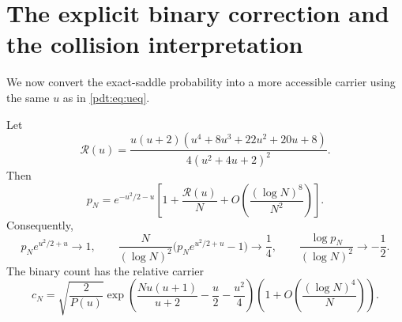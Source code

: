 \section{The explicit binary correction and the collision interpretation}
\label{pdt:sec:rational}
We now convert the exact-saddle probability into a more accessible carrier using the same $u$ as in \eqref{pdt:eq:ueq}.

\begin{theorem}\label{pdt:thm:rational}
Let
\begin{equation}\label{pdt:eq:Ru}
 \mathcal R(u)=\frac{u(u+2)(u^4+8u^3+22u^2+20u+8)}
                     {4(u^2+4u+2)^2}.
\end{equation}
Then
\begin{equation}\label{pdt:eq:explicitratio}
 p_N=e^{-u^2/2-u}\left[1+\frac{\mathcal R(u)}N
                         +O\!\left(\frac{(\log N)^8}{N^2}\right)\right].
\end{equation}
Consequently,
\begin{equation}\label{pdt:eq:ratiolimits}
 p_Ne^{u^2/2+u}\to1,\qquad
 \frac N{(\log N)^2}\bigl(p_Ne^{u^2/2+u}-1\bigr)\to\frac14,
 \qquad \frac{\log p_N}{(\log N)^2}\to-\frac12.
\end{equation}
The binary count has the relative carrier
\begin{equation}\label{pdt:eq:ccarrier}
 c_N=\sqrt{\frac2{P(u)}}
 \exp\!\left(\frac{Nu(u+1)}{u+2}-\frac u2-\frac{u^2}4\right)
 \left(1+O\!\left(\frac{(\log N)^4}{N}\right)\right).
\end{equation}
\end{theorem}
